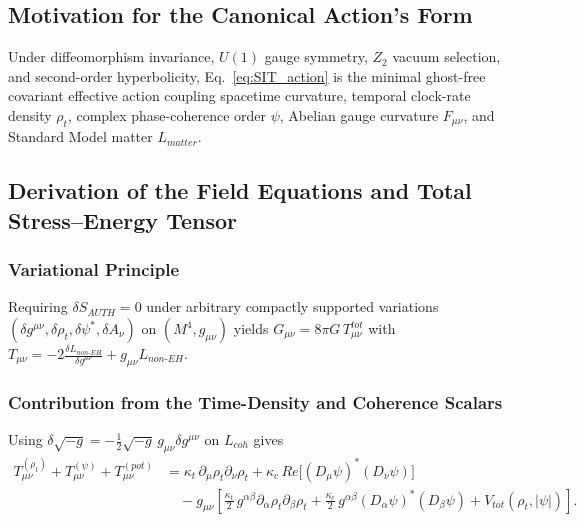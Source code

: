 \documentclass[american,11pt,letterpaper]{article}
\def\mathbb#1{#1}%
\def\mathcal#1{#1}%
\def\mathrm#1{#1}%
\begin{document}
\subsection{Motivation for the Canonical Action's Form}

Under diffeomorphism invariance, $U(1)$ gauge symmetry, $\mathbb{Z}_2$ vacuum selection, and second-order hyperbolicity, Eq.~\eqref{eq:SIT_action} is the minimal ghost-free covariant effective action coupling spacetime curvature, temporal clock-rate density $\rho_t$, complex phase-coherence order $\psi$, Abelian gauge curvature $F_{\mu\nu}$, and Standard Model matter $\mathcal{L}_{\mathrm{matter}}$.

\subsection{Derivation of the Field Equations and Total Stress--Energy Tensor}

\subsubsection{Variational Principle}

Requiring $\delta S_{\mathrm{AUTH}} = 0$ under arbitrary compactly supported variations $(\delta g^{\mu\nu}, \delta\rho_t, \delta\psi^*, \delta A_\nu)$ on $(\mathcal{M}^4, g_{\mu\nu})$ yields $G_{\mu\nu} = 8\pi G\,T_{\mu\nu}^{\mathrm{tot}}$ with $T_{\mu\nu} = -2\frac{\delta\mathcal{L}_{\mathrm{non\text{-}EH}}}{\delta g^{\mu\nu}} + g_{\mu\nu}\mathcal{L}_{\mathrm{non\text{-}EH}}$.

\subsubsection{Contribution from the Time-Density and Coherence Scalars}

Using $\delta\sqrt{-g} = -\frac{1}{2}\sqrt{-g}\,g_{\mu\nu}\delta g^{\mu\nu}$ on $\mathcal{L}_{\mathrm{coh}}$ gives
\begin{align}
T_{\mu\nu}^{(\rho_t)} + T_{\mu\nu}^{(\psi)} + T_{\mu\nu}^{(\mathrm{pot})}
&= \kappa_t\,\partial_\mu\rho_t\partial_\nu\rho_t
  + \kappa_c\,\mathrm{Re}\bigl[(D_\mu\psi)^*(D_\nu\psi)\bigr]
  \nonumber\\
&\quad
  - g_{\mu\nu}\left[
    \frac{\kappa_t}{2}\,g^{\alpha\beta}\partial_\alpha\rho_t\partial_\beta\rho_t
    + \frac{\kappa_c}{2}\,g^{\alpha\beta}(D_\alpha\psi)^*(D_\beta\psi)
    + V_{\mathrm{tot}}(\rho_t,|\psi|)
  \right].
\label{eq:T_scalar_combined_sec8}
\end{align}
\end{document}
